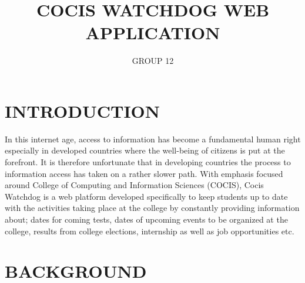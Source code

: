 \documentclass{article}
\begin{document}
\title{COCIS WATCHDOG WEB APPLICATION}
\author{GROUP 12}

\maketitle

\section{INTRODUCTION}

In this internet age, access to information has become a fundamental human right especially in developed countries where the well-being of citizens is put at the forefront. It is therefore unfortunate that in developing countries the process to information access has taken on a rather slower path. With emphasis focused around College of Computing and Information Sciences (COCIS), Cocis Watchdog is a web platform developed specifically to keep students up to date with the activities taking place at the college by constantly providing information about; dates for coming tests, dates of upcoming events to be organized at the college, results from college elections, internship as well as job opportunities etc.

\section{BACKGROUND}
\end{document}
